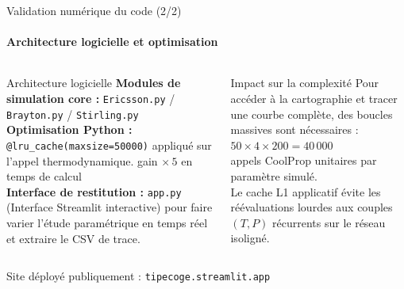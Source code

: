 \documentclass[aspectratio=43, 10pt]{beamer}
\newcommand{\Tmax}{T_{\max}}
\begin{document}
\begin{frame}{Validation num\'erique du code (2/2)}
  \framesubtitle{Architecture logicielle et optimisation}

  \begin{columns}[T,onlytextwidth]
      \begin{block}{Architecture logicielle}
        \normalsize
        \textbf{Modules de simulation core :}
        \texttt{Ericsson.py} / \texttt{Brayton.py} /
        \texttt{Stirling.py}\\[6pt]
        \textbf{Optimisation Python :}
        \texttt{@lru\_cache(maxsize=50000)} appliqu\'e sur l'appel thermodynamique.
        gain $\times\,5$ en temps de calcul\\[6pt]
        \textbf{Interface de restitution :}
        \texttt{app.py} (Interface Streamlit interactive) pour faire varier l'\'etude param\'etrique en temps r\'eel et extraire le CSV de trace.
      \end{block}
      

      \begin{exampleblock}{Impact sur la complexit\'e}
        \normalsize
        Pour acc\'eder \`a la cartographie et tracer une courbe compl\`ete, des boucles massives sont n\'ecessaires :\\[8pt]
        $50 \times 4 \times 200 = 40\,000$\\[2pt]
        appels CoolProp unitaires par param\`etre simul\'e.\\[8pt]
        Le cache L1 applicatif \'evite les r\'e\'evaluations lourdes
        aux couples $(T,P)$ r\'ecurrents sur le r\'eseau isolign\'e.
      \end{exampleblock}
      
  \end{columns}
  \begin{block}{}
    \normalsize\centering
    Site d\'eploy\'e publiquement : \texttt{tipecoge.streamlit.app}
  \end{block}
\end{frame}



\newcommand{\diapobilani}{
\begin{frame}{Synth\`ese progressive des propri\'et\'es th\'eoriques}
  \begin{center}\small
  \renewcommand{\arraystretch}{1.2}
  \begin{tabular}{lccc}
    \toprule
    & \textbf{Brayton} & \textbf{Ericsson} & \textbf{Stirling} \\
    \midrule
    $\eta$ d\'epend de $\Tmax$ ? & \textcolor{rougeCycle}{Non} & \textcolor{vertCycle}{Oui} & \textcolor{vertCycle}{Oui} \\
    \bottomrule
  \end{tabular}
  \end{center}
\end{frame}
}
\end{document}
